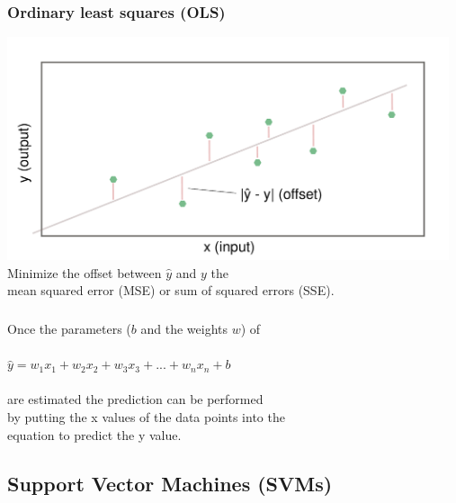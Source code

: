 \documentclass[aspectratio=169]{beamer}
\begin{document}
\begin{frame}
  \frametitle{Ordinary least squares (OLS)}
  \begin{center}
    \includegraphics[width=13.0cm]{images/linear_model_ordinary_least_squares.pdf}
    Minimize the offset between $\hat{y}$ and $y$ the\\
    mean squared error (MSE) or sum of squared errors (SSE).
  \end{center}
\end{frame}


\begin{frame}
  \frametitle{}
  \begin{block}{}
    \begin{center}
      Once the parameters ($b$ and the weights $w$) of\\
      \ \\
      $\hat{y} = w_{1}x_{1} + w_{2}x_{2} + w_{3}x_{3} + ... + w_{n}x_{n} + b$\\
      \ \\
      are estimated the prediction can be performed\\
      by putting the x values of the data points into the\\
      equation to predict the y value.
    \end{center}
  \end{block}
\end{frame}

\subsection{Support Vector Machines (SVMs)}

\setcounter{tocdepth}{2}
\begin{frame}{}
   \tableofcontents[currentsubsection]
\end{frame}
\end{document}
